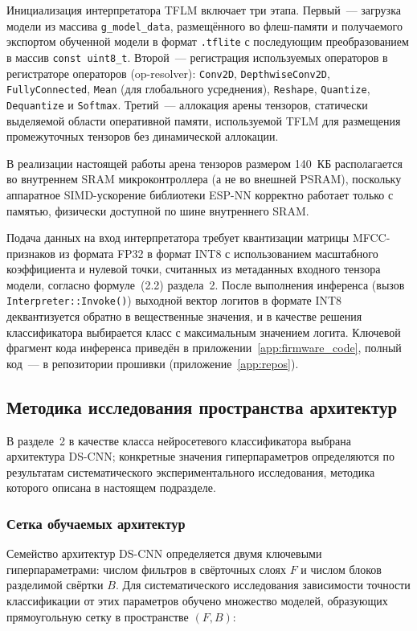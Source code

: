 Инициализация интерпретатора TFLM включает три этапа. Первый~---
загрузка модели из массива \texttt{g\_model\_data},
размещённого во флеш-памяти и получаемого экспортом обученной
модели в формат \texttt{.tflite} с последующим преобразованием в
массив \texttt{const uint8\_t}. Второй~--- регистрация
используемых операторов в регистраторе операторов
(op-resolver): \texttt{Conv2D}, \texttt{DepthwiseConv2D},
\texttt{FullyConnected}, \texttt{Mean} (для глобального
усреднения), \texttt{Reshape}, \texttt{Quantize},
\texttt{Dequantize} и \texttt{Softmax}. Третий~--- аллокация
арены тензоров, статически выделяемой области оперативной
памяти, используемой TFLM для размещения промежуточных
тензоров без динамической аллокации.

В реализации настоящей работы арена тензоров размером 140~КБ
располагается во внутреннем SRAM микроконтроллера (а не во
внешней PSRAM), поскольку аппаратное SIMD-ускорение библиотеки
ESP-NN корректно работает только с памятью, физически доступной
по шине внутреннего SRAM.

Подача данных на вход интерпретатора требует квантизации
матрицы MFCC-признаков из формата FP32 в формат INT8 с
использованием масштабного коэффициента и нулевой точки,
считанных из метаданных входного тензора модели, согласно
формуле~(2.2) раздела~2. После выполнения инференса (вызов
\texttt{Interpreter::Invoke()}) выходной вектор логитов в
формате INT8 деквантизуется обратно в вещественные значения, и
в качестве решения классификатора выбирается класс с
максимальным значением логита. Ключевой фрагмент кода
инференса приведён в приложении~\ref{app:firmware_code}, полный
код~--- в репозитории прошивки
(приложение~\ref{app:repos}).

\subsection{Методика исследования пространства архитектур}

В разделе~2 в качестве класса нейросетевого классификатора
выбрана архитектура DS-CNN; конкретные значения гиперпараметров
определяются по результатам систематического экспериментального
исследования, методика которого описана в настоящем подразделе.

\subsubsection{Сетка обучаемых архитектур}

Семейство архитектур DS-CNN определяется двумя ключевыми
гиперпараметрами: числом фильтров в свёрточных слоях $F$ и
числом блоков разделимой свёртки $B$. Для систематического
исследования зависимости точности классификации от этих
параметров обучено множество моделей, образующих
прямоугольную сетку в пространстве $(F, B)$:

